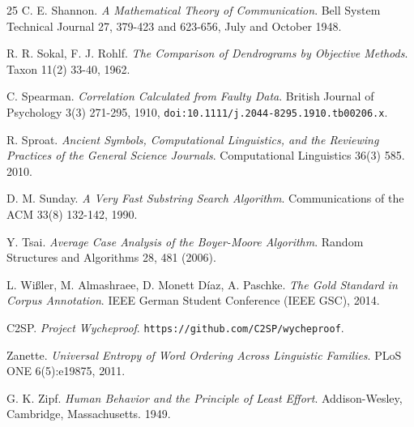 \begin{thebibliography}{25}
C. E. Shannon. \emph{A Mathematical Theory of Communication}. Bell System Technical Journal 27, 379-423 and 623-656, July and October 1948.

R. R. Sokal, F. J. Rohlf. \emph{The Comparison of Dendrograms by Objective Methods}. Taxon 11(2) 33-40, 1962.

C. Spearman. \emph{Correlation Calculated from Faulty Data}. British Journal of Psychology 3(3) 271-295, 1910, \texttt{doi:10.1111/\allowbreak{}j.2044-8295.1910.tb00206.x}.

R. Sproat. \emph{Ancient Symbols, Computational Linguistics, and the Reviewing Practices of the General Science Journals}. Computational Linguistics 36(3) 585. 2010.

D. M. Sunday. \emph{A Very Fast Substring Search Algorithm}. Communications of the ACM 33(8) 132-142, 1990.

Y. Tsai. \emph{Average Case Analysis of the Boyer-Moore Algorithm}. Random Structures and Algorithms 28, 481 (2006).

L. Wi\ss{}ler, M. Almashraee, D. Monett D\'iaz, A. Paschke. \emph{The Gold Standard in Corpus Annotation}. IEEE German Student Conference (IEEE GSC), 2014.

C2SP. \emph{Project Wycheproof}. \texttt{https:/\allowbreak{}/\allowbreak{}github.com/\allowbreak{}C2SP/\allowbreak{}wycheproof}.

Zanette. \emph{Universal Entropy of Word Ordering Across Linguistic Families}. PLoS ONE 6(5):e19875, 2011.

G. K. Zipf. \emph{Human Behavior and the Principle of Least Effort}. Addison-Wesley, Cambridge, Massachusetts. 1949.

\end{thebibliography}
